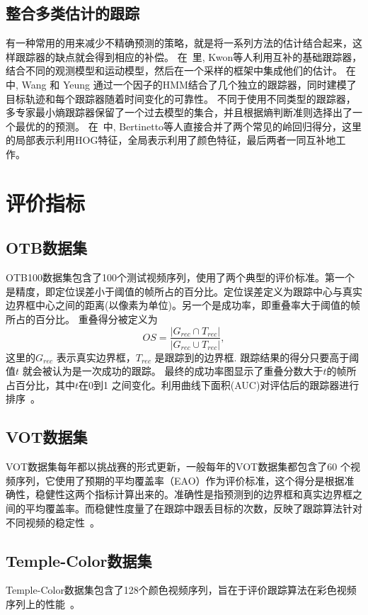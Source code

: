 \subsection{整合多类估计的跟踪}
有一种常用的用来减少不精确预测的策略，就是将一系列方法的估计结合起来，这样跟踪器的缺点就会得到相应的补偿。
%
在~\cite{kwon2010visual, kwon2011tracking}里, Kwon等人利用互补的基础跟踪器，结合不同的观测模型和运动模型，然后在一个采样的框架中集成他们的估计。
%
在\cite{wang2014ensemble}中, Wang 和 Yeung 通过一个因子的HMM结合了几个独立的跟踪器，同时建模了目标轨迹和每个跟踪器随着时间变化的可靠性。
%
不同于使用不同类型的跟踪器，多专家最小熵跟踪器保留了一个过去模型的集合，并且根据熵判断准则选择出了一个最优的的预测。
%
在~\cite{bertinetto2016staple}中, Bertinetto等人直接合并了两个常见的岭回归得分，这里的局部表示利用HOG特征，全局表示利用了颜色特征，最后两者一同互补地工作。
%






\section{评价指标}
\subsection{OTB数据集}
OTB100数据集包含了100个测试视频序列，使用了两个典型的评价标准。第一个是精度，即定位误差小于阈值的帧所占的百分比。定位误差定义为跟踪中心与真实边界框中心之间的距离(以像素为单位)。另一个是成功率，即重叠率大于阈值的帧所占的百分比。
%
重叠得分被定义为
\begin{equation}
OS = \frac{{\left| {{G_{rec}} \cap {T_{rec}}} \right|}}{{\left| {{G_{rec}} \cup {T_{rec}}} \right|}},
\end{equation}
这里的${{G_{rec}}}$ 表示真实边界框，${{T_{rec}}}$ 是跟踪到的边界框. 跟踪结果的得分只要高于阈值$t$ 就会被认为是一次成功的跟踪。
%
最终的成功率图显示了重叠分数大于$t$的帧所占百分比，其中$t$在0到1 之间变化。利用曲线下面积(AUC)对评估后的跟踪器进行排序~\cite{wu2015object}。
%
\subsection{VOT数据集}
VOT数据集每年都以挑战赛的形式更新，一般每年的VOT数据集都包含了60 个视频序列，它使用了预期的平均覆盖率（EAO）作为评价标准，这个得分是根据准确性，稳健性这两个指标计算出来的。准确性是指预测到的边界框和真实边界框之间的平均覆盖率。而稳健性度量了在跟踪中跟丢目标的次数，反映了跟踪算法针对不同视频的稳定性~\cite{kristan2015visual}。

\subsection{Temple-Color数据集}
Temple-Color数据集包含了128个颜色视频序列，旨在于评价跟踪算法在彩色视频序列上的性能~\cite{liang2015encoding}。
